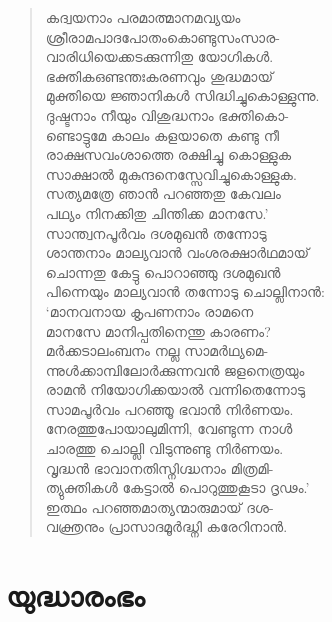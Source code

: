 \begin{verse}
കദ്വയനാം പരമാത്മാനമവ്യയം\\
ശ്രീരാമപാദപോതംകൊണ്ടുസംസാര-\\
വാരിധിയെക്കടക്കുന്നിതു യോഗികള്‍.\\
ഭക്തികഒണ്ടന്തഃകരണവും ശുദ്ധമായ്\\
മുക്തിയെ ജ്ഞാനികള്‍ സിദ്ധിച്ചുകൊള്ളുന്നു.\\
ദുഷ്ടനാം നീയും വിശുദ്ധനാം ഭക്തികൊ-\\
ണ്ടൊട്ടുമേ കാലം കളയാതെ കണ്ടു നീ\\
രാക്ഷസവംശാത്തെ രക്ഷിച്ചു കൊള്ളുക\\
സാക്ഷാല്‍ മുകുന്ദനെസ്സേവിച്ചുകൊള്ളുക.\\
സത്യമത്രേ ഞാന്‍ പറഞ്ഞതു കേവലം\\
പഥ്യം നിനക്കിതു ചിന്തിക്ക മാനസേ.’\\
സാന്ത്വനപൂര്‍വം ദശമുഖന്‍ തന്നോടു\\
ശാന്തനാം മാല്യവാന്‍ വംശരക്ഷാര്‍ഥമായ്\\
ചൊന്നതു കേട്ടു പൊറാഞ്ഞു ദശമുഖന്‍\\
പിന്നെയും മാല്യവാന്‍ തന്നോടു ചൊല്ലിനാന്‍:\\
‘മാനവനായ കൃപണനാം രാമനെ\\
മാനസേ മാനിപ്പതിനെന്തു കാരണം?\\
മര്‍ക്കടാലംബനം നല്ല സാമര്‍ഥ്യമെ-\\
ന്നുള്‍ക്കാമ്പിലോര്‍ക്കുന്നവന്‍ ജളനെത്രയും\\
രാമന്‍ നിയോഗിക്കയാല്‍ വന്നിതെന്നോടു\\
സാമപൂര്‍വം പറഞ്ഞൂ ഭവാന്‍ നിര്‍ണയം.\\
നേരത്തുപോയാലുമിന്നി, വേണ്ടുന്ന നാള്‍\\
ചാരത്തു ചൊല്ലി വിടുന്നുണ്ടു നിര്‍ണയം.\\
വൃദ്ധന്‍ ഭാവാനതിസ്നിഗ്ദ്ധനാം മിത്രമി-\\
ത്യുക്തികള്‍ കേട്ടാല്‍ പൊറുത്തുകൂടാ ദൃഢം.’\\
ഇത്ഥം പറഞ്ഞമാത്യന്മാരുമായ് ദശ-\\
വക്ത്രനും പ്രാസാദമൂര്‍ദ്ധ്നി കരേറിനാന്‍.
\end{verse}


\section{യുദ്ധാരംഭം}

